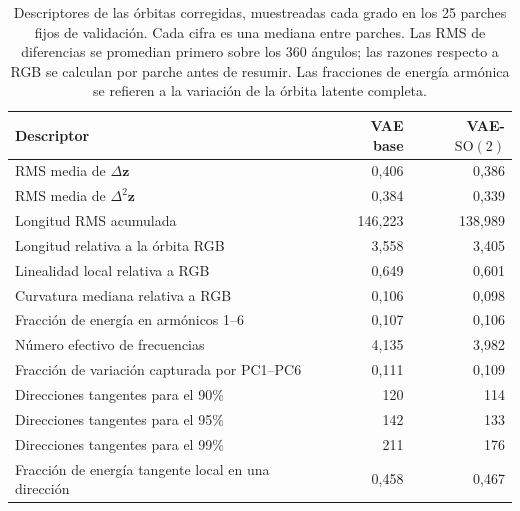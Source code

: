 \begin{table}[htbp]
    \centering
    \caption[Descriptores de órbita y subespacios tangentes.]{Descriptores de las órbitas corregidas, muestreadas cada grado en los 25 parches fijos de validación. Cada cifra es una mediana entre parches. Las RMS de diferencias se promedian primero sobre los 360 ángulos; las razones respecto a RGB se calculan por parche antes de resumir. Las fracciones de energía armónica se refieren a la variación de la órbita latente completa.}
    \label{tab:descriptores-orbitas}
    \small
    \begin{tabular}{@{}lrr@{}}
        \toprule
        Descriptor & VAE base & VAE-\(\mathrm{SO}(2)\) \\
        \midrule
        RMS media de \(\Delta\mathbf z\) & 0,406 & 0,386 \\
        RMS media de \(\Delta^2\mathbf z\) & 0,384 & 0,339 \\
        Longitud RMS acumulada & 146,223 & 138,989 \\
        Longitud relativa a la órbita RGB & 3,558 & 3,405 \\
        Linealidad local relativa a RGB & 0,649 & 0,601 \\
        Curvatura mediana relativa a RGB & 0,106 & 0,098 \\
        Fracción de energía en armónicos 1--6 & 0,107 & 0,106 \\
        Número efectivo de frecuencias & 4,135 & 3,982 \\
        Fracción de variación capturada por PC1--PC6 & 0,111 & 0,109 \\
        Direcciones tangentes para el 90\% & 120 & 114 \\
        Direcciones tangentes para el 95\% & 142 & 133 \\
        Direcciones tangentes para el 99\% & 211 & 176 \\
        Fracción de energía tangente local en una dirección & 0,458 & 0,467 \\
        \bottomrule
    \end{tabular}
\end{table}
